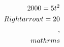 \documentclass[preview]{standalone}
\begin{document}
\begin{align*}
\special{dvisvgm:raw <g id='unique000'>}2000 = 5 t^2 \\Rightarrow t = 20\\,\\mathrm{s}\special{dvisvgm:raw </g>}
\end{align*}
\end{document}

